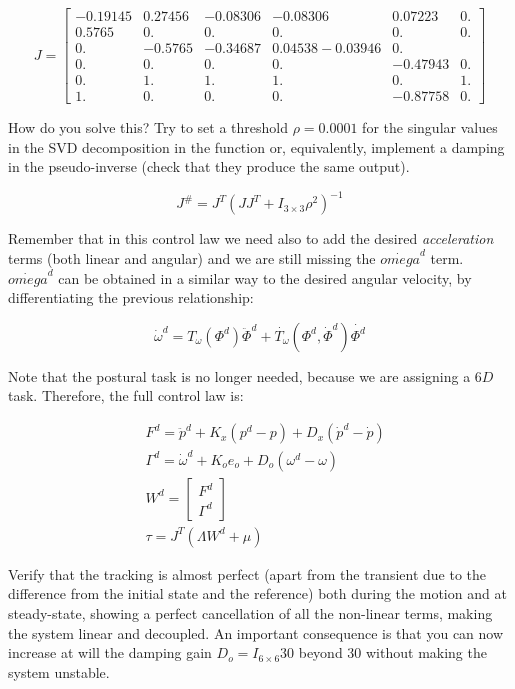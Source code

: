 \documentclass[11pt]{article}
\newcommand{\mat}[1]{\ensuremath{\begin{bmatrix}#1\end{bmatrix}}}	%
\begin{document}
 \begin{equation}
  J = \mat{-0.19145 &0.27456& -0.08306 &-0.08306 & 0.07223 & 0. \\    
  0.5765&   0.    &   0.  &     0.   &    0.  &     0.     \\
  0.    &  -0.5765 & -0.34687&  0.04538 -0.03946  &0.     \\
  0.  &     0.  &     0.    &   0. &     -0.47943 & 0.     \\
  0.  &     1.  &     1.    &   1.  &     0.      & 1.     \\
  1.  &     0.  &     0.    &   0.&      -0.87758 & 0.     }
 \end{equation}

How do you solve this? Try to set a threshold $\rho = 0.0001$ for the singular values in the 
SVD decomposition in the  function or, equivalently, implement  a damping in the pseudo-inverse (check that they produce the same output). 

\begin{equation}
J^{\#} = J^T\left(J J^T + I_{3\times 3}\rho^2\right)^{-1}
\end{equation} 

Remember that in this control law we need also to add the desired \textit{acceleration} terms (both linear and angular) and we are still missing the $\dot{omega}^d$ term. $\dot{omega}^d$ can be obtained in a similar way to the desired angular velocity, by differentiating the previous relationship:

\begin{equation}
\dot{\omega}^d = T_{\omega}(\Phi^d) \ddot{\Phi}^d +  \dot{T_{\omega}}(\Phi^d,\dot{\Phi}^d ) \dot{\Phi^d}
\end{equation}

Note that the postural task is no longer needed, because we are assigning a $6D$ task. Therefore, the full control law is:
 
\begin{align}
& F^d = \ddot{p}^d + K_x(p^d - p) + D_x(\dot{p}^d -\dot{p})  \\
& \Gamma^d  = \dot{\omega}^d + K_{o} e_o  + D_o(\omega^d - \omega)  \\
& W^d = \mat{F^d \\ \Gamma^d} \\
& \tau = J^T\left( \Lambda W^d + \mu \right)
\end{align} 

Verify that the tracking is almost perfect (apart from the transient due to the difference from the initial state and the reference) both during the motion and at steady-state, showing a perfect cancellation of all the non-linear terms, making the system linear and decoupled. 
An important consequence is that you can now increase at will the damping gain  $D_o = I_{6\times6}30$ beyond 30 without making the system unstable.

 
\end{document}
